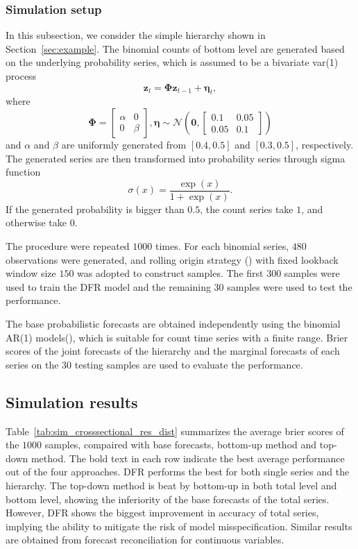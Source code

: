 \documentclass[a4paper,review,12pt,authoryear]{elsarticle}
\begin{document}
\subsubsection{Simulation setup}
In this subsection, we consider the simple hierarchy shown in Section~\ref{sec:example}.
The binomial counts of bottom level are generated based on the underlying probability series, which is assumed to be a bivariate var(1) process
\[\mathbf{z}_t = \mathbf{\Phi}\mathbf{z}_{t-1}+\boldsymbol{\eta}_t,\]
where
\[
  \mathbf{\Phi} = \left[\begin{matrix}
    \alpha & 0 \\
    0 & \beta
  \end{matrix}\right], \boldsymbol{\eta} \sim \mathcal{N}\left(\mathbf{0}, \left[\begin{matrix}
    0.1 & 0.05 \\
    0.05 & 0.1 
  \end{matrix}\right]\right)
\]
and $\alpha$ and $\beta$ are uniformly generated from $[0.4, 0.5]$ and $[0.3,0.5]$, respectively. 
The generated series are then transformed into probability series through sigma function 
\[
\sigma(x) = \frac{\exp(x)}{1+\exp(x)}.
\]
If the generated probability is bigger than $0.5$, the count series take $1$, and otherwise take $0$.

The procedure were repeated $1000$ times. 
For each binomial series, $480$ observations were generated,
and rolling origin strategy () with fixed lookback window size $150$ was adopted to construct samples. 
The first $300$ samples were used to train the DFR model and the remaining $30$ samples were used to test the performance.

The base probabilistic forecasts are obtained independently using the binomial AR(1) models(\citealp{weissParameterEstimationBinomial2013}), which is suitable for count time series with a finite range.
Brier scores of the joint forecasts of the hierarchy and the marginal forecasts of each series on the $30$ testing samples are used to evaluate the performance. 

\subsection{Simulation results}
Table~\ref{tab:sim_crosssectional_res_dist} summarizes the average brier scores of the $1000$ samples, compaired with base forecasts, bottom-up method and top-down method.
The bold text in each row indicate the best average performance out of the four approaches.
DFR performs the best for both single series and the hierarchy. 
The top-down method is beat by bottom-up in both total level and bottom level, showing the inferiority of the base forecasts of the total series.
However, DFR shows the biggest improvement in accuracy of total series, implying the ability to mitigate the risk of model misspecification.
Similar results are obtained from forecast reconciliation for continuous variables.
\end{document}
